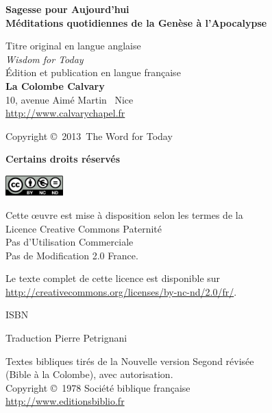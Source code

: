 \newpage
\mbox{}
\vfill

{\scriptsize

{\bfseries Sagesse pour Aujourd'hui\\
 Méditations quotidiennes de la Genèse à l'Apocalypse}

Titre original en langue anglaise\frcolon{}\\
\emph{Wisdom for Today} \\

Édition et publication en langue fran\c{c}aise\frcolon{}\\
 {\bfseries La Colombe Calvary}\\
 10, avenue Aimé Martin ~Nice\\
 \url{http://www.calvarychapel.fr}

Copyright \copyright{}~2013~The Word for Today

{\bfseries Certains droits réservés}

\includegraphics[width=6em]{by-nc-nd_eu}

Cette \oe{}uvre est mise à disposition selon les termes de la \\
 Licence Creative Commons Paternité \\
 \ocadr Pas d'Utilisation Commerciale \\
 \ocadr Pas de Modification 2.0 France.

Le texte complet de cette licence est disponible sur \\
 \url{http://creativecommons.org/licenses/by-nc-nd/2.0/fr/}.

ISBN~\isbn

Traduction\frcolon{} Pierre Petrignani

Textes bibliques tirés de la Nouvelle version Segond révisée \\
 (Bible à la Colombe), avec autorisation. \\
 Copyright \copyright{}~1978 Société biblique fran\c{c}aise \\
 \url{http://www.editionsbiblio.fr}

}
\pagebreak

